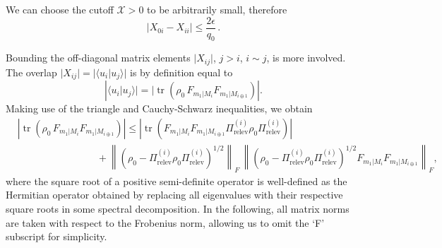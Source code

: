 We can choose the cutoff $\mathcal{X}>0$ to be arbitrarily small, therefore
\begin{equation}
\vert X_{0i} - X_{ii} \vert \leq \frac{2\epsilon}{q_0}\,.
\end{equation}

Bounding the off-diagonal matrix elements $\vert X_{ij}\vert$, $j>i$, $i \sim j$, is more involved. The overlap $\vert X_{ij} \vert = \vert \langle u_i \vert u_j \rangle \vert$ is by definition equal to
\begin{equation}
\left| \langle u_i \vert u_j \rangle \vert = \vert \operatorname{tr}\left(\rho_0 \, F_{m_1\vert M_i} F_{m_1\vert M_{i\oplus 1}}\right)\right|.
\end{equation}
Making use of the triangle and Cauchy-Schwarz inequalities, we obtain
\doublespacing
\begin{equation}
\label{eqn:initialbound}
\begin{split}
& \left| \operatorname{tr}\left(\rho_0 \, F_{m_1\vert M_i} F_{m_1\vert M_{i\oplus 1}}\right) \right| \leq  \left| \operatorname{tr}\left(F_{m_1\vert M_i} F_{m_1\vert M_{i \oplus 1}}\Pi_{\text{relev}}^{(i)}\rho_0\Pi_{\text{relev}}^{(i)}\right)\right| \\ & \hspace{8em} + \left\|\left(\rho_0-\Pi_{\text{relev}}^{(i)}\rho_0\Pi_{\text{relev}}^{(i)}\right)^{1/2}\right\|_F\,\left\|\left(\rho_0-\Pi_{\text{relev}}^{(i)}\rho_0\Pi_{\text{relev}}^{(i)}\right)^{1/2} F_{m_1\vert M_i} F_{m_1\vert M_{i\oplus 1}}\right\|_F,
\end{split}
\end{equation}
\onehalfspacing
where the square root of a positive semi-definite operator is well-defined as the Hermitian operator obtained by replacing all eigenvalues with their respective square roots in some spectral decomposition. In the following, all matrix norms are taken with respect to the Frobenius norm, allowing us to omit the `F' subscript for simplicity.

